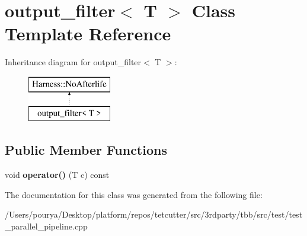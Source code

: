 \hypertarget{classoutput__filter}{}\section{output\+\_\+filter$<$ T $>$ Class Template Reference}
\label{classoutput__filter}
Inheritance diagram for output\+\_\+filter$<$ T $>$\+:\begin{figure}[H]
\begin{center}
\leavevmode
\includegraphics[height=2.000000cm]{classoutput__filter}
\end{center}
\end{figure}
\subsection*{Public Member Functions}
\begin{DoxyCompactItemize}
\item 
\hypertarget{classoutput__filter_affbb052031c8015ee2533b7d42b13f37}{}void {\bfseries operator()} (T c) const \label{classoutput__filter_affbb052031c8015ee2533b7d42b13f37}

\end{DoxyCompactItemize}


The documentation for this class was generated from the following file\+:\begin{DoxyCompactItemize}
\item 
/\+Users/pourya/\+Desktop/platform/repos/tetcutter/src/3rdparty/tbb/src/test/test\+\_\+parallel\+\_\+pipeline.\+cpp\end{DoxyCompactItemize}
